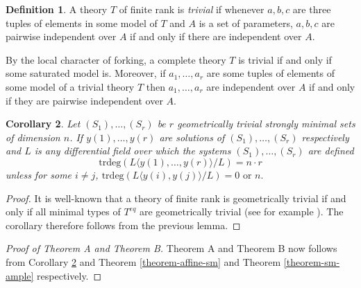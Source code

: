 \documentclass[12pt]{amsart}
\theoremstyle{definition}
\newtheorem{definition}{Definition}[subsection]
\theoremstyle{plain}
\newtheorem{corollary}[definition]{Corollary}
\theoremstyle{exampstyle}
\theoremstyle{exampstyle}\newtheorem{thmxbis}{Theorem}
\numberwithin{equation}{section}
\theoremstyle{remark}
\begin{document}
\begin{definition} 
A theory $T$ of finite rank is \textit{trivial} if whenever $a,b,c$ are three tuples of elements in some model of $T$ and $A$ is a set of parameters, $a,b,c$ are pairwise independent over $A$ if and only if there are independent over $A$. 
\end{definition}

By the local character of forking, a complete theory $T$ is trivial if and only if some saturated model is. Moreover, if $a_1,\ldots, a_r$ are some tuples of elements of some model of a trivial theory $T$ then $a_1,\ldots, a_r$
are independent over $A$ if and only if they are pairwise independent over $A$.

\begin{corollary} \label{triviality-decoupledsystem}
Let $(S_1),\ldots, (S_r)$ be $r$ geometrically trivial strongly minimal sets of dimension $n$. If $y(1),\ldots, y(r)$ are solutions of $(S_1),\ldots, (S_r)$ respectively and $L$ is any differential field over which the systems $(S_1),\ldots, (S_r)$ are defined
$$\mathrm{trdeg}(L\langle y(1),\ldots, y(r)\rangle / L) = n\cdot r$$
unless for some $i \neq j$,
$\mathrm{trdeg}(L\langle y(i),y(j) \rangle/L) = 0 \text{ or } n.$
\end{corollary}

\begin{proof} 
It is well-known that a theory of finite rank is geometrically trivial if and only if all minimal types of $T^{eq}$ are geometrically trivial (see for example \cite{Goode}). The corollary therefore follows from the previous lemma. 
\end{proof} 



\begin{proof}[Proof of Theorem A and Theorem B] 
Theorem A and Theorem B now follows from Corollary \ref{triviality-decoupledsystem} and Theorem \ref{theorem-affine-sm} and Theorem \ref{theorem-sm-ample} respectively. 
\end{proof} 
\end{document}
